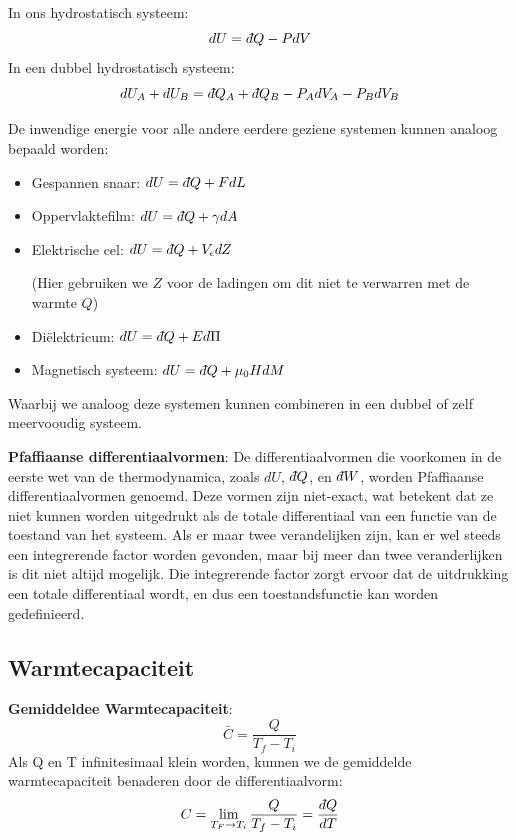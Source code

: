 In ons hydrostatisch systeem:
\[
dU = \dbar Q - PdV
\]
In een dubbel hydrostatisch systeem:
\[
dU_A + dU_B = \dbar Q_A + \dbar Q_B - P_A dV_A - P_B dV_B
\]

De inwendige energie voor alle andere eerdere geziene systemen kunnen analoog bepaald worden:
\begin{itemize}
    \item Gespannen snaar: \(dU = \dbar Q + FdL\)
    \item Oppervlaktefilm: \(dU = \dbar Q + \gamma dA\)
    \item Elektrische cel: \(dU = \dbar Q + V_\epsilon dZ\) 
    
    (Hier gebruiken we \(Z\) voor de ladingen om dit niet te verwarren met de warmte \(Q\))
    \item Diëlektricum: \(dU = \dbar Q + E d\Pi\)
    \item Magnetisch systeem: \(dU = \dbar Q + \mu_0 H dM\)
\end{itemize}

Waarbij we analoog deze systemen kunnen combineren in een dubbel of zelf meervooudig systeem.

\begin{definition}
    \textbf{Pfaffiaanse differentiaalvormen}: De differentiaalvormen die voorkomen in de eerste wet van de thermodynamica, zoals \(dU\), \(\dbar Q\), en \(\dbar W\), worden Pfaffiaanse differentiaalvormen genoemd.
    Deze vormen zijn niet-exact, wat betekent dat ze niet kunnen worden uitgedrukt als de totale differentiaal van een functie van de toestand van het systeem.
    Als er maar twee verandelijken zijn, kan er wel steeds een integrerende factor worden gevonden, maar bij meer dan twee veranderlijken is dit niet altijd mogelijk. 
    Die integrerende factor zorgt ervoor dat de uitdrukking een totale differentiaal wordt, en dus een toestandsfunctie kan worden gedefinieerd.
\end{definition}


\subsection{Warmtecapaciteit}

\begin{definition}
    \textbf{Gemiddeldee Warmtecapaciteit}: 
    \[\bar{C} = \frac{Q}{T_f-T_i}\]
    Als Q en T infinitesimaal klein worden, kunnen we de gemiddelde warmtecapaciteit benaderen door de differentiaalvorm:
    \[C = \lim_{T_F \to T_i} \frac{Q}{T_f - T_i} =\frac{\dbar Q}{dT}\]
\end{definition}


